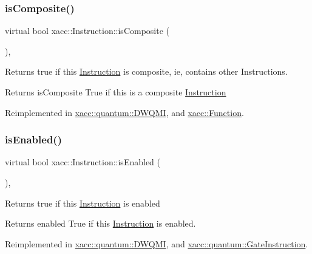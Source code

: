 \subsubsection{\texorpdfstring{is\+Composite()}{isComposite()}}
{\footnotesize\ttfamily virtual bool xacc\+::\+Instruction\+::is\+Composite (\begin{DoxyParamCaption}{ }\end{DoxyParamCaption})\hspace{0.3cm}{\ttfamily [inline]}, {\ttfamily [virtual]}}

Returns true if this \hyperlink{a01657}{Instruction} is composite, ie, contains other Instructions.

\begin{DoxyReturn}{Returns}
is\+Composite True if this is a composite \hyperlink{a01657}{Instruction} 
\end{DoxyReturn}


Reimplemented in \hyperlink{a01225_ad2b3b4ee72dee48150bf78d92c52e5e0}{xacc\+::quantum\+::\+D\+W\+Q\+MI}, and \hyperlink{a01653_aa75500c657b5c3e0e36213e1506aad97}{xacc\+::\+Function}.

\mbox{\label{a01657_ad02a1cf7220577124720b7a51424cea7}} 
\subsubsection{\texorpdfstring{is\+Enabled()}{isEnabled()}}
{\footnotesize\ttfamily virtual bool xacc\+::\+Instruction\+::is\+Enabled (\begin{DoxyParamCaption}{ }\end{DoxyParamCaption})\hspace{0.3cm}{\ttfamily [inline]}, {\ttfamily [virtual]}}

Returns true if this \hyperlink{a01657}{Instruction} is enabled

\begin{DoxyReturn}{Returns}
enabled True if this \hyperlink{a01657}{Instruction} is enabled. 
\end{DoxyReturn}


Reimplemented in \hyperlink{a01225_aea76901b30d85172ef26fc317b4c0ed7}{xacc\+::quantum\+::\+D\+W\+Q\+MI}, and \hyperlink{a01253_a0a821be322b0c848b01c55f91fc8f484}{xacc\+::quantum\+::\+Gate\+Instruction}.

\mbox{\label{a01657_a7b24d8ae485369fc2b2df7a3224a5e26}} 
